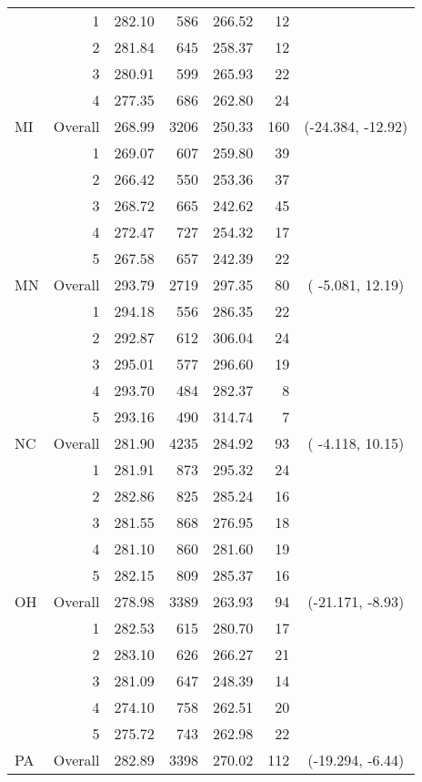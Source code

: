 \begin{longtable}{lrrr@{\extracolsep{.25cm}}rrc}
   & 1 & 282.10 & 586 & 266.52 &  12 &  \\ 
   & 2 & 281.84 & 645 & 258.37 &  12 &  \\ 
   & 3 & 280.91 & 599 & 265.93 &  22 &  \\ 
   & 4 & 277.35 & 686 & 262.80 &  24 &  \\ 
   \hline
MI & Overall & 268.99 & 3206 & 250.33 & 160 & (-24.384, -12.92) \\ 
   & 1 & 269.07 & 607 & 259.80 &  39 &  \\ 
   & 2 & 266.42 & 550 & 253.36 &  37 &  \\ 
   & 3 & 268.72 & 665 & 242.62 &  45 &  \\ 
   & 4 & 272.47 & 727 & 254.32 &  17 &  \\ 
   & 5 & 267.58 & 657 & 242.39 &  22 &  \\ 
   \hline
MN & Overall & 293.79 & 2719 & 297.35 &  80 & ( -5.081,  12.19) \\ 
   & 1 & 294.18 & 556 & 286.35 &  22 &  \\ 
   & 2 & 292.87 & 612 & 306.04 &  24 &  \\ 
   & 3 & 295.01 & 577 & 296.60 &  19 &  \\ 
   & 4 & 293.70 & 484 & 282.37 &   8 &  \\ 
   & 5 & 293.16 & 490 & 314.74 &   7 &  \\ 
   \hline
NC & Overall & 281.90 & 4235 & 284.92 &  93 & ( -4.118,  10.15) \\ 
   & 1 & 281.91 & 873 & 295.32 &  24 &  \\ 
   & 2 & 282.86 & 825 & 285.24 &  16 &  \\ 
   & 3 & 281.55 & 868 & 276.95 &  18 &  \\ 
   & 4 & 281.10 & 860 & 281.60 &  19 &  \\ 
   & 5 & 282.15 & 809 & 285.37 &  16 &  \\ 
   \hline
OH & Overall & 278.98 & 3389 & 263.93 &  94 & (-21.171,  -8.93) \\ 
   & 1 & 282.53 & 615 & 280.70 &  17 &  \\ 
   & 2 & 283.10 & 626 & 266.27 &  21 &  \\ 
   & 3 & 281.09 & 647 & 248.39 &  14 &  \\ 
   & 4 & 274.10 & 758 & 262.51 &  20 &  \\ 
   & 5 & 275.72 & 743 & 262.98 &  22 &  \\ 
   \hline
PA & Overall & 282.89 & 3398 & 270.02 & 112 & (-19.294,  -6.44) \\ 

\end{longtable}
